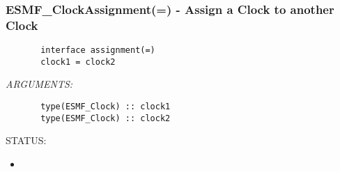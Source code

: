  
\setlength{\oldparskip}{\parskip}
\setlength{\parskip}{1.5ex}
\setlength{\oldparindent}{\parindent}
\setlength{\parindent}{0pt}
\setlength{\oldbaselineskip}{\baselineskip}
\setlength{\baselineskip}{11pt}
 
\def\bv{\begin{verbatim}}
\def\ev{\end{verbatim}}
\def\be{\begin{equation}}
\def\ee{\end{equation}}
\def\bea{\begin{eqnarray}}
\def\eea{\end{eqnarray}}
\def\bi{\begin{itemize}}
\def\ei{\end{itemize}}
\def\bn{\begin{enumerate}}
\def\en{\end{enumerate}}
\def\bd{\begin{description}}
\def\ed{\end{description}}
\def\({\left (}
\def\){\right )}
\def\[{\left [}
\def\]{\right ]}
\def\<{\left  \langle}
\def\>{\right \rangle}
\def\cI{{\cal I}}
\def\diag{\mathop{\rm diag}}
\def\tr{\mathop{\rm tr}}


 
\subsubsection [ESMF\_ClockAssignment(=)] {ESMF\_ClockAssignment(=) - Assign a Clock to another Clock}


  
\begin{verbatim}       interface assignment(=)
       clock1 = clock2\end{verbatim}{\em ARGUMENTS:}
\begin{verbatim}       type(ESMF_Clock) :: clock1
       type(ESMF_Clock) :: clock2\end{verbatim}
{\sf STATUS:}
   \begin{itemize}
   \item{}
   \end{itemize}
  
